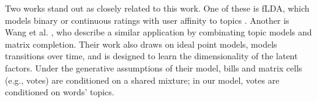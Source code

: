 Two works stand out as closely related to this work.  One of these is
fLDA, which models binary or continuous ratings with user affinity to
topics \cite{agarwal:2010}.  Another is Wang et
al. \cite{wang:2010}, who describe a similar application by
combinating topic models and matrix completion.  Their work also draws
on ideal point models, models transitions over time, and is designed
to learn the dimensionality of the latent factors.  Under the
generative assumptions of their model, bills and matrix cells (e.g.,
votes) are conditioned on a shared mixture; in our model, votes are
conditioned on words' topics.








